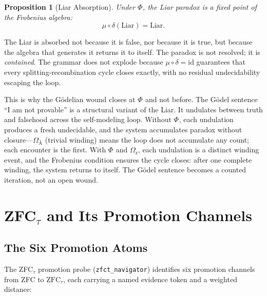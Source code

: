 \documentclass[12pt,twoside]{book}
\newtheorem{proposition}[theorem]{Proposition}
\theoremstyle{definition}
\newcommand{\ZFCt}{\text{ZFC}_{\tau}}
\newcommand{\moebius}{\mu \circ \delta = \text{id}}
\begin{document}
\begin{proposition}[Liar Absorption]
Under $\Phi_{\text{}}$, the Liar paradox is a fixed point of the Frobenius algebra:
\begin{equation}
\mu \circ \delta(\text{Liar}) = \text{Liar}.
\end{equation}
\end{proposition}

The Liar is absorbed not because it is false, nor because it is true, but because the algebra that generates it returns it to itself. The paradox is not resolved; it is \emph{contained}. The grammar does not explode because $\moebius$ guarantees that every splitting-recombination cycle closes exactly, with no residual undecidability escaping the loop.

This is why the G\"odelian wound closes at $\Phi_{\text{}}$ and not before. The G\"odel sentence ``I am not provable'' is a structural variant of the Liar. It undulates between truth and falsehood across the self-modeling loop. Without $\Phi_{\text{}}$, each undulation produces a fresh undecidable, and the system accumulates paradox without closure---$\Omega_{\text{Å}}$ (trivial winding) means the loop does not accumulate any count; each encounter is the first. With $\Phi_{\text{}}$ and $\Omega_{\text{z}}$, each undulation is a distinct winding event, and the Frobenius condition ensures the cycle closes: after one complete winding, the system returns to itself. The G\"odel sentence becomes a counted iteration, not an open wound.%
\chapter{ZFC$_{\tau}$ and Its Promotion Channels}

\section{The Six Promotion Atoms}

The ZFC$_{\tau}$ promotion probe (\texttt{zfct\_navigator}) identifies six promotion channels from ZFC to $\ZFCt$, each carrying a named evidence token and a weighted distance:
\end{document}
